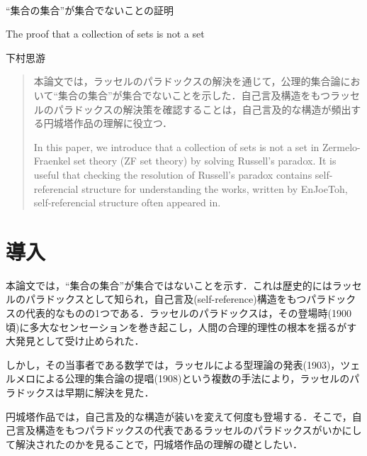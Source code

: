 \documentclass[10pt, a5paper, twoside]{jsarticle}
\theoremstyle{definition}
\begin{document}
	~ %

	\begin{center}

		\Large{“集合の集合”が集合でないことの証明}

		\vspace{3mm}

		\large{The proof that a collection of sets is not a set}

		\vspace{3mm}
		
		\large{下村思游}

	\end{center}

	\vspace{3mm}

	\begin{abstract}

		本論文では，ラッセルのパラドックスの解決を通じて，公理的集合論において“集合の集合”が集合でないことを示した．自己言及構造をもつラッセルのパラドックスの解決策を確認することは，自己言及的な構造が頻出する円城塔作品の理解に役立つ．

		\vspace{3mm}

		In this paper, we introduce that a collection of sets is not a set in Zermelo-Fraenkel set theory (ZF set theory) by solving Russell's paradox. It is useful that checking the resolution of Russell's paradox contains self-referencial structure for understanding the works, written by EnJoeToh, self-referencial structure often appeared in.

	\end{abstract}

	\section{導入}

		本論文では，“集合の集合”が集合ではないことを示す．これは歴史的にはラッセルのパラドックスとして知られ，自己言及(self-reference)構造をもつパラドックスの代表的なものの1つである．ラッセルのパラドックスは，その登場時(1900頃)\cite{fre,dis}に多大なセンセーションを巻き起こし，人間の合理的理性の根本を揺るがす大発見として受け止められた\cite{noe}．

		しかし，その当事者である数学では，ラッセルによる型理論の発表(1903)\cite{rus}，ツェルメロによる公理的集合論の提唱(1908)\cite{zer}という複数の手法により，ラッセルのパラドックスは早期に解決を見た．

		円城塔作品では，自己言及的な構造が装いを変えて何度も登場する．そこで，自己言及構造をもつパラドックスの代表であるラッセルのパラドックスがいかにして解決されたのかを見ることで，円城塔作品の理解の礎としたい．
\end{document}

